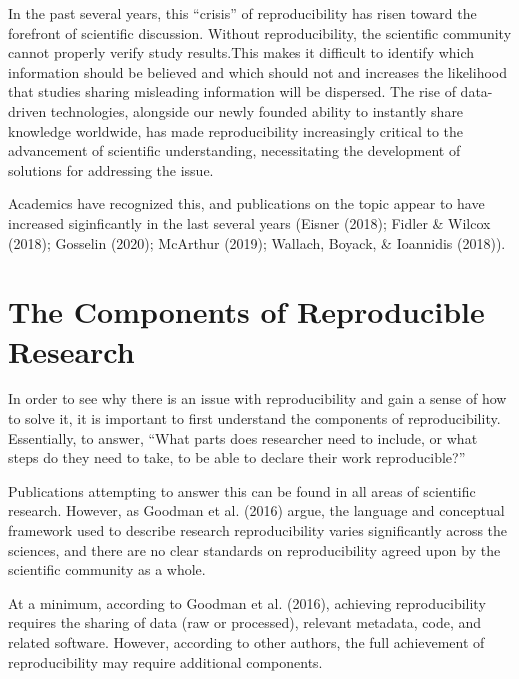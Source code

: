 \documentclass[12pt,twoside]{reedthesis}
\begin{document}
In the past several years, this ``crisis'' of reproducibility has risen
toward the forefront of scientific discussion. Without reproducibility,
the scientific community cannot properly verify study results.This makes
it difficult to identify which information should be believed and which
should not and increases the likelihood that studies sharing misleading
information will be dispersed. The rise of data-driven technologies,
alongside our newly founded ability to instantly share knowledge
worldwide, has made reproducibility increasingly critical to the
advancement of scientific understanding, necessitating the development
of solutions for addressing the issue.

Academics have recognized this, and publications on the topic appear to
have increased siginficantly in the last several years (Eisner (2018);
Fidler \& Wilcox (2018); Gosselin (2020); McArthur (2019); Wallach,
Boyack, \& Ioannidis (2018)).

\section{The Components of Reproducible
Research}\label{the-components-of-reproducible-research}

In order to see why there is an issue with reproducibility and gain a
sense of how to solve it, it is important to first understand the
components of reproducibility. Essentially, to answer, ``What parts does
researcher need to include, or what steps do they need to take, to be
able to declare their work reproducible?''

Publications attempting to answer this can be found in all areas of
scientific research. However, as Goodman et al. (2016) argue, the
language and conceptual framework used to describe research
reproducibility varies significantly across the sciences, and there are
no clear standards on reproducibility agreed upon by the scientific
community as a whole.

At a minimum, according to Goodman et al. (2016), achieving
reproducibility requires the sharing of data (raw or processed),
relevant metadata, code, and related software. However, according to
other authors, the full achievement of reproducibility may require
additional components.
\end{document}
